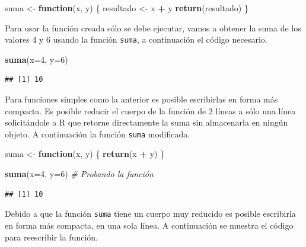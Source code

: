 \documentclass[10pt,]{krantz}
\makeatletter
\newenvironment{Shaded}{\begin{snugshade}}{\end{snugshade}}
\newcommand{\KeywordTok}[1]{\textcolor[rgb]{0.13,0.29,0.53}{\textbf{#1}}}
\newcommand{\DataTypeTok}[1]{\textcolor[rgb]{0.13,0.29,0.53}{#1}}
\newcommand{\DecValTok}[1]{\textcolor[rgb]{0.00,0.00,0.81}{#1}}
\newcommand{\StringTok}[1]{\textcolor[rgb]{0.31,0.60,0.02}{#1}}
\newcommand{\CommentTok}[1]{\textcolor[rgb]{0.56,0.35,0.01}{\textit{#1}}}
\newcommand{\ControlFlowTok}[1]{\textcolor[rgb]{0.13,0.29,0.53}{\textbf{#1}}}
\newcommand{\OperatorTok}[1]{\textcolor[rgb]{0.81,0.36,0.00}{\textbf{#1}}}
\newcommand{\NormalTok}[1]{#1}
\newenvironment{kframe}{%
\medskip{}
\setlength{\fboxsep}{.8em}
 \def\at@end@of@kframe{}%
 \ifinner\ifhmode%
  \def\at@end@of@kframe{\end{minipage}}%
  \begin{minipage}{\columnwidth}%
 \fi\fi%
 \def\FrameCommand##1{\hskip\@totalleftmargin \hskip-\fboxsep
 \colorbox{shadecolor}{##1}\hskip-\fboxsep
     \hskip-\linewidth \hskip-\@totalleftmargin \hskip\columnwidth}%
 \MakeFramed {\advance\hsize-\width
   \@totalleftmargin\z@ \linewidth\hsize
   \@setminipage}}%
 {\par\unskip\endMakeFramed%
 \at@end@of@kframe}
\renewenvironment{Shaded}{\begin{kframe}}{\end{kframe}}
\makeatother
\begin{document}
\begin{Shaded}
\begin{Highlighting}[]
\NormalTok{suma <-}\StringTok{ }\ControlFlowTok{function}\NormalTok{(x, y) \{}
\NormalTok{  resultado <-}\StringTok{ }\NormalTok{x }\OperatorTok{+}\StringTok{ }\NormalTok{y}
  \KeywordTok{return}\NormalTok{(resultado)}
\NormalTok{\}}
\end{Highlighting}
\end{Shaded}

Para usar la función creada sólo se debe ejecutar, vamos a obtener la
suma de los valores 4 y 6 usando la función \texttt{suma}, a
continuación el código necesario.

\begin{Shaded}
\begin{Highlighting}[]
\KeywordTok{suma}\NormalTok{(}\DataTypeTok{x=}\DecValTok{4}\NormalTok{, }\DataTypeTok{y=}\DecValTok{6}\NormalTok{)}
\end{Highlighting}
\end{Shaded}

\begin{verbatim}
## [1] 10
\end{verbatim}

Para funciones simples como la anterior es posible escribirlas en forma
más compacta. Es posible reducir el cuerpo de la función de 2 líneas a
sólo una línea solicitándole a R que retorne directamente la suma sin
almacenarla en ningún objeto. A continuación la función \texttt{suma}
modificada.

\begin{Shaded}
\begin{Highlighting}[]
\NormalTok{suma <-}\StringTok{ }\ControlFlowTok{function}\NormalTok{(x, y) \{}
  \KeywordTok{return}\NormalTok{(x }\OperatorTok{+}\StringTok{ }\NormalTok{y)}
\NormalTok{\}}

\KeywordTok{suma}\NormalTok{(}\DataTypeTok{x=}\DecValTok{4}\NormalTok{, }\DataTypeTok{y=}\DecValTok{6}\NormalTok{)  }\CommentTok{# Probando la función}
\end{Highlighting}
\end{Shaded}

\begin{verbatim}
## [1] 10
\end{verbatim}

Debido a que la función \texttt{suma} tiene un cuerpo muy reducido es
posible escribirla en forma más compacta, en una sola línea. A
continuación se muestra el código para reescribir la función.
\end{document}
